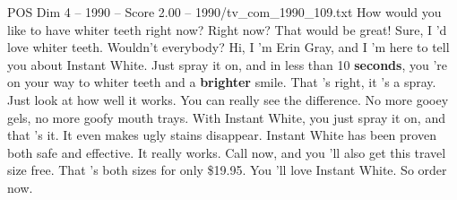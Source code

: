 \begin{textsample}{POS Dim 4 – 1990 – Score 2.00 – 1990/tv\_com\_1990\_109.txt}  \label{ex:f4_pos_023}
How would you like to have whiter teeth right now?
Right now?
That would be great!
Sure, I 'd love whiter teeth.
Wouldn't everybody?
Hi, I 'm Erin Gray, and I 'm here to tell you about Instant White.
Just spray it on, and in less than 10 \textbf{seconds}, you 're on your way to whiter teeth and a \textbf{brighter} smile.
That 's right, it 's a spray.
Just look at how well it works.
You can really see the difference.
No more gooey gels, no more goofy mouth trays.
With Instant White, you just spray it on, and that 's it.
It even makes ugly stains disappear.
Instant White has been proven both safe and effective.
It really works.
Call now, and you 'll also get this travel size free.
That 's both sizes for only \$19.95.
You 'll love Instant White.
So order now.

\end{textsample}
